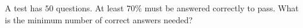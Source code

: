 A test has $50$ questions. At least $70\%$ must be answered correctly to pass. What is the minimum number of correct answers needed?
